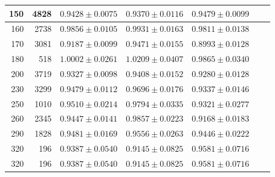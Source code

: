 \begin{table}[htb!]
\begin{center}
{\begin{tabular}{|r|r|l|l|l|l|l|}
    150  \hspace*{1.0em} &  4828\hspace*{1.0em} & $0.9428 \pm 0.0075$ & $0.9370 \pm 0.0116$ & $0.9479 \pm 0.0099$  \\ \hline
    160  \hspace*{1.0em} &  2738\hspace*{1.0em} & $0.9856 \pm 0.0105$ & $0.9931 \pm 0.0163$ & $0.9811 \pm 0.0138$  \\ \hline
    170  \hspace*{1.0em} &  3081\hspace*{1.0em} & $0.9187 \pm 0.0099$ & $0.9471 \pm 0.0155$ & $0.8993 \pm 0.0128$  \\ \hline
    180  \hspace*{1.0em} &   518\hspace*{1.0em} & $1.0002 \pm 0.0261$ & $1.0209 \pm 0.0407$ & $0.9865 \pm 0.0340$  \\ \hline
    200  \hspace*{1.0em} &  3719\hspace*{1.0em} & $0.9327 \pm 0.0098$ & $0.9408 \pm 0.0152$ & $0.9280 \pm 0.0128$  \\ \hline
    230  \hspace*{1.0em} &  3299\hspace*{1.0em} & $0.9479 \pm 0.0112$ & $0.9696 \pm 0.0176$ & $0.9337 \pm 0.0146$  \\ \hline
    250  \hspace*{1.0em} &  1010\hspace*{1.0em} & $0.9510 \pm 0.0214$ & $0.9794 \pm 0.0335$ & $0.9321 \pm 0.0277$  \\ \hline
    260  \hspace*{1.0em} &  2345\hspace*{1.0em} & $0.9447 \pm 0.0141$ & $0.9857 \pm 0.0223$ & $0.9168 \pm 0.0183$  \\ \hline
    290  \hspace*{1.0em} &  1828\hspace*{1.0em} & $0.9481 \pm 0.0169$ & $0.9556 \pm 0.0263$ & $0.9446 \pm 0.0222$  \\ \hline
    320  \hspace*{1.0em} &   196\hspace*{1.0em} & $0.9387 \pm 0.0540$ & $0.9145 \pm 0.0825$ & $0.9581 \pm 0.0716$  \\ \hline
    320  \hspace*{1.0em} &   196\hspace*{1.0em} & $0.9387 \pm 0.0540$ & $0.9145 \pm 0.0825$ & $0.9581 \pm 0.0716$  \\ \hline

\end{tabular}}
\end{center}
\end{table}
